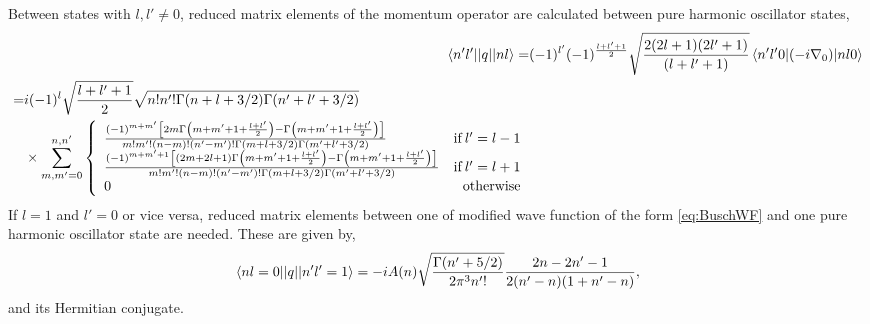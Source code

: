 \documentclass[%
 preprint,
 amsmath,amssymb,
 aps,
]{revtex4-1}
\begin{document}
Between states with $l,l'\neq0$, reduced matrix elements of the momentum operator are calculated between pure harmonic oscillator states,
\begin{align}
\braket{n'l' || q || n l}=&(-1)^{l'}(-1)^{\frac{l+l'+1}{2}}\sqrt{\frac{2(2l+1)(2l'+1)}{(l+l'+1)}}\braket{n'l'0| (-i \nabla_0) | n l 0} \\
\begin{split} =& i(-1)^{l}\sqrt{\frac{l+l'+1}{2}}\sqrt{n!n'!\Gamma(n+l+3/2)\Gamma(n'+l'+3/2)} \\ 
&\times\sum_{m,m'=0}^{n,n'} \left\{
     \begin{array}{lr}
       \frac{(-1)^{m+m'}\left[2m\Gamma\left(m+m'+1+\frac{l+l'}{2}\right)-\Gamma\left(m+m'+1+\frac{l+l'}{2}\right)\right]}{m!m'!(n-m)!(n'-m')!\Gamma(m+l+3/2)\Gamma(m'+l'+3/2)} & \text{if}\: l'=l-1 \\
        \frac{(-1)^{m+m'+1}\left[(2m+2l+1)\Gamma\left(m+m'+1+\frac{l+l'}{2}\right)-\Gamma\left(m+m'+1+\frac{l+l'}{2}\right)\right]}{m!m'!(n-m)!(n'-m')!\Gamma(m+l+3/2)\Gamma(m'+l'+3/2)} & \text{if}\: l'=l+1 \\
       0 & \text{otherwise}
     \end{array}
   \right.
   \end{split}
\end{align}
If $l=1$ and $l'=0$ or vice versa, reduced matrix elements between one of modified wave function of the form \eqref{eq:BuschWF} and one pure harmonic oscillator state are needed. These are given by,
\begin{align}
\braket{n l=0 || q || n' l'=1}=-i A(n) \sqrt{\frac{\Gamma(n'+5/2)}{2\pi^3 n'!}}\frac{2n-2n'-1}{2(n'-n)(1+n'-n)},
\end{align}
and its Hermitian conjugate.
\end{document}
